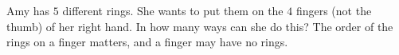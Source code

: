 Amy has $5$ different rings. She wants to put them on the $4$ fingers (not the thumb) of her right hand. In how many ways can she do this? The order of the rings on a finger matters, and a finger may have no rings.
